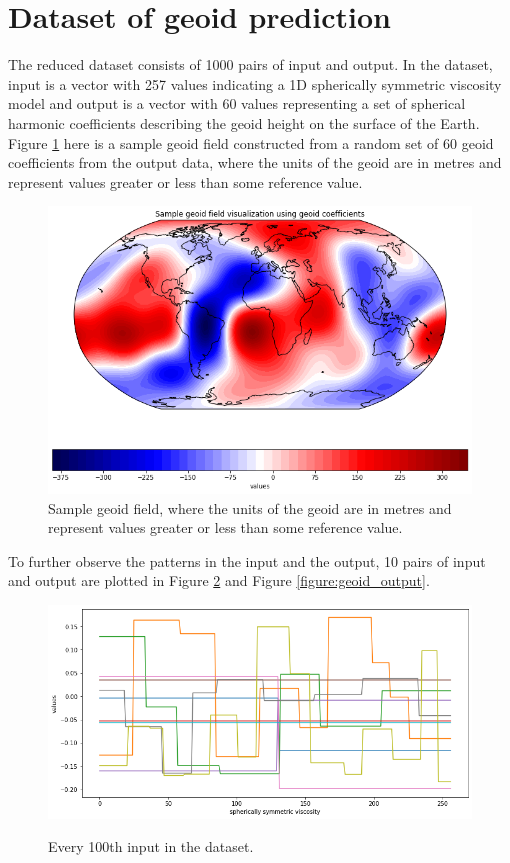 \section{Dataset of geoid prediction}

The reduced dataset consists of 1000 pairs of input and output. In the dataset, input is a vector with 257 values indicating a 1D spherically symmetric viscosity model and output is a vector with 60 values representing a set of spherical harmonic coefficients describing the geoid height on the surface of the Earth. Figure \ref{figure:geoid_sample} here is a sample geoid field constructed from a random set of 60 geoid coefficients from the output data, where the units of the geoid are in metres and represent values greater or less than some reference value.

\begin{figure}[H]
    \caption{Sample geoid field, where the units of the geoid are in metres and represent values greater or less than some reference value.}
    \label{figure:geoid_sample}
    \includegraphics[scale=0.6]{figures/geoid_images/Geoid_Sample_visualization.png}
\end{figure}

To further observe the patterns in the input and the output, 10 pairs of input and output are plotted in Figure \ref{figure:geoid_input} and Figure \ref{figure:geoid_output}.

\begin{figure}[H]
    \centering
    \caption{Every 100th input in the dataset.}
    \includegraphics[scale=0.5]{figures/geoid_images/Geoid_sample_input.png}
    \label{figure:geoid_input}
\end{figure}

